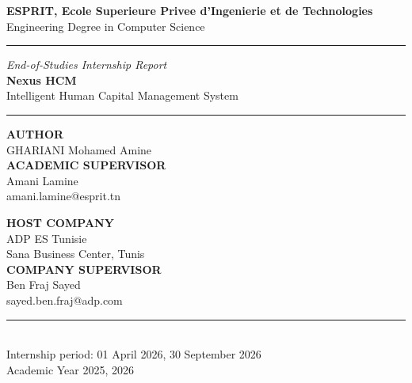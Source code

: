 \documentclass[12pt,a4paper]{report}
\begin{document}
\sloppy

\begin{titlepage}
\centering
\vspace*{1.2cm}
{\large\bfseries\color{adpdark}
  ESPRIT, Ecole Superieure Privee d'Ingenierie et de Technologies}\\[0.25cm]
{\normalsize\color{adpgray} Engineering Degree in Computer Science}

\vspace{1cm}
{\color{adpborder}\rule{\linewidth}{0.5pt}}
\vspace{1cm}

{\fontsize{11}{13}\selectfont\color{adpgray}\textit{End-of-Studies Internship Report}}\\[0.5cm]
{\LARGE\bfseries\color{adpdark} Nexus HCM}\\[0.25cm]
{\Large\color{adpgray} Intelligent Human Capital Management System}

\vspace{0.6cm}
{\color{adpred}\rule{8cm}{1.2pt}}
\vspace{1.6cm}

\begin{minipage}{0.46\textwidth}
\begin{flushleft}
{\small\bfseries\color{adpgray} AUTHOR}\\[2pt]
{\normalsize\color{adpdark} GHARIANI Mohamed Amine}\\[0.6cm]
{\small\bfseries\color{adpgray} ACADEMIC SUPERVISOR}\\[2pt]
{\normalsize\color{adpdark} Amani Lamine}\\
{\small\color{adpgray}\ttfamily amani.lamine@esprit.tn}
\end{flushleft}
\end{minipage}
\hfill
\begin{minipage}{0.46\textwidth}
\begin{flushright}
{\small\bfseries\color{adpgray} HOST COMPANY}\\[2pt]
{\normalsize\color{adpdark} ADP ES Tunisie}\\
{\small\color{adpgray} Sana Business Center, Tunis}\\[0.6cm]
{\small\bfseries\color{adpgray} COMPANY SUPERVISOR}\\[2pt]
{\normalsize\color{adpdark} Ben Fraj Sayed}\\
{\small\color{adpgray}\ttfamily sayed.ben.fraj@adp.com}
\end{flushright}
\end{minipage}

\vfill
{\color{adpborder}\rule{\linewidth}{0.5pt}}\\[0.4cm]
{\small\color{adpgray} Internship period: 01 April 2026, 30 September 2026}\\[0.2cm]
{\small\color{adpgray} Academic Year 2025, 2026}
\end{titlepage}
\end{document}
